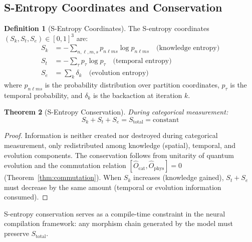 \documentclass[11pt,twocolumn,a4paper]{article}
\newtheorem{theorem}{Theorem}[section]
\theoremstyle{definition}
\newtheorem{definition}[theorem]{Definition}
\theoremstyle{remark}
\newcommand{\Sk}{S_k}
\newcommand{\St}{S_t}
\newcommand{\Se}{S_e}
\begin{document}
\subsection{S-Entropy Coordinates and Conservation}

\begin{definition}[S-Entropy Coordinates]
\label{def:s_entropy}
The S-entropy coordinates $(\Sk, \St, \Se) \in [0,1]^3$ are:
\begin{align}
\Sk &= -\sum_{n,\ell,m,s} p_{n\ell ms} \log p_{n\ell ms} \quad \text{(knowledge entropy)} \\
\St &= -\sum_{\tau} p_{\tau} \log p_{\tau} \quad \text{(temporal entropy)} \\
\Se &= \sum_k \delta_k \quad \text{(evolution entropy)}
\end{align}
where $p_{n\ell ms}$ is the probability distribution over partition coordinates, $p_\tau$ is the temporal probability, and $\delta_k$ is the backaction at iteration $k$.
\end{definition}

\begin{theorem}[S-Entropy Conservation]
\label{thm:conservation}
During categorical measurement:
\begin{equation}
\Sk + \St + \Se = S_{\mathrm{total}} = \mathrm{constant}
\end{equation}
\end{theorem}

\begin{proof}
Information is neither created nor destroyed during categorical measurement, only redistributed among knowledge (spatial), temporal, and evolution components. The conservation follows from unitarity of quantum evolution and the commutation relation $[\hat{O}_{\mathrm{cat}}, \hat{O}_{\mathrm{phys}}] = 0$ (Theorem~\ref{thm:commutation}). When $\Sk$ increases (knowledge gained), $\St + \Se$ must decrease by the same amount (temporal or evolution information consumed).
\end{proof}

S-entropy conservation serves as a compile-time constraint in the neural compilation framework: any morphism chain generated by the model must preserve $S_{\mathrm{total}}$.
\end{document}
